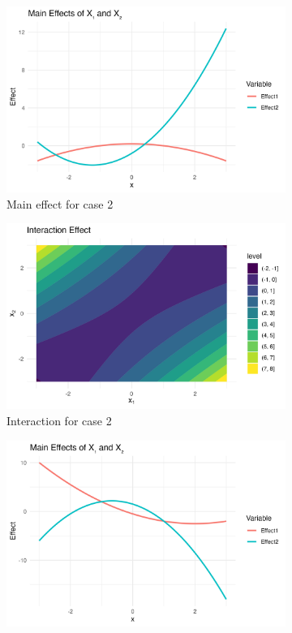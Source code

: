 \begin{figure}[htpb]
\begin{subfigure}[t]{0.49\textwidth}
        \includegraphics[width=\textwidth]{images/full_a1p00_a2p20_a11p00_a22p10_a12m05_rhop05_main.png}
        \caption{Main effect for case 2}
    \end{subfigure}%
    \hfill
    \begin{subfigure}[t]{0.49\textwidth}
        \includegraphics[width=\textwidth]{images/full_a1p00_a2p20_a11p00_a22p10_a12m05_rhop05_interaction.png}
        \caption{Interaction for case 2}
    \end{subfigure}
    \begin{subfigure}[t]{0.49\textwidth}
        \includegraphics[width=\textwidth]{images/full_a1m20_a2m20_a11p10_a22m10_a12p10_rhom10_main.png}

\end{subfigure}
\end{figure}

